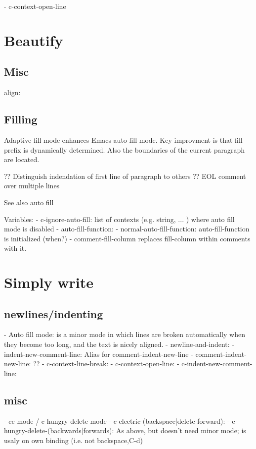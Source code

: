 \documentclass[a4paper]{report}
\begin{document}
- c-context-open-line  

  
\section{Beautify}

\subsection{Misc}
align: 

\subsection{Filling}

Adaptive fill mode enhances Emacs auto fill mode. Key improvment is that
fill-prefix is dynamically determined. Also the boundaries of the
current paragraph are located.

?? Distinguish indendation of first line of paragraph to others
?? EOL comment over multiple lines

See also auto fill

Variables:
- c-ignore-auto-fill: list of contexts (e.g. string, ... ) where auto
  fill mode is disabled
- auto-fill-function: 
- normal-auto-fill-function: auto-fill-function is initialized (when?)
- comment-fill-column replaces fill-column within comments
with it.

\section{Simply write}

\subsection{newlines/indenting}

- Auto fill mode: is a minor mode in which lines are broken automatically
when they become too long, and the text is nicely aligned.
- newline-and-indent:
- indent-new-comment-line: Alias for comment-indent-new-line 
- comment-indent-new-line: ??
- c-context-line-break: 
- c-context-open-line:
- c-indent-new-comment-line:

\subsection{misc}
- cc mode / c hungry delete mode
  - c-electric-(backspace|delete-forward):
  - c-hungry-delete-(backwards|forwards): As above, but doesn't need
    minor mode; is usaly on own binding (i.e. not backspace,C-d)
\end{document}

